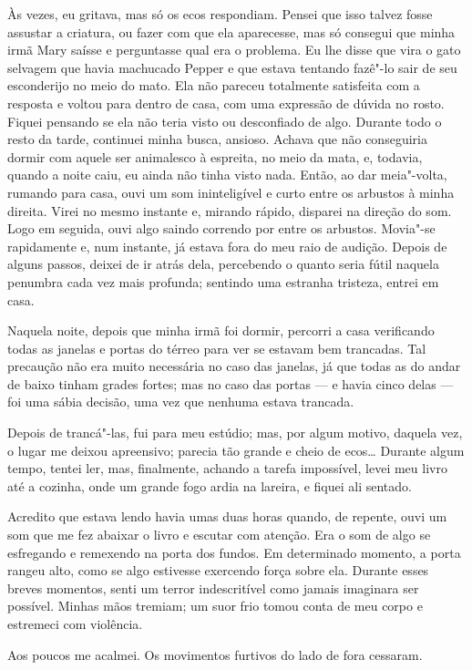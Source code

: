 Às vezes, eu gritava, mas só os ecos respondiam. Pensei que isso talvez fosse assustar a criatura, ou fazer com que 
ela aparecesse, mas só consegui que minha irmã Mary saísse e perguntasse qual era o problema. Eu lhe disse
que vira o gato selvagem que havia machucado Pepper e que estava tentando fazê"-lo sair de seu esconderijo no meio do
mato. Ela não pareceu totalmente satisfeita com a resposta e voltou para dentro de casa, com uma expressão de dúvida no
rosto. Fiquei pensando se ela não teria visto ou desconfiado de algo. Durante todo o resto da tarde, continuei minha
busca, ansioso. Achava que não conseguiria dormir com aquele ser animalesco à espreita, no meio da mata, e, todavia,
quando a noite caiu, eu ainda não tinha visto nada. Então, ao dar meia"-volta, rumando para casa, ouvi um som
ininteligível e curto entre os arbustos à minha direita. Virei no mesmo instante e, mirando rápido, disparei na direção
do som. Logo em seguida, ouvi algo saindo correndo por entre os arbustos. Movia"-se rapidamente e, num instante, já
estava fora do meu raio de audição. Depois de alguns passos, deixei de ir atrás dela, percebendo o quanto seria fútil
naquela penumbra cada vez mais profunda; sentindo uma estranha tristeza, entrei em casa.

Naquela noite, depois que minha irmã foi dormir, percorri a casa verificando todas as janelas e portas do térreo para
ver se estavam bem trancadas. Tal precaução não era muito necessária no caso das janelas, já que todas as do andar de
baixo tinham grades fortes; mas no caso das portas --- e havia cinco delas --- foi uma sábia decisão, uma vez que nenhuma estava
trancada.

Depois de trancá"-las, fui para meu estúdio; mas, por algum motivo, daquela vez, o lugar me deixou apreensivo; parecia
tão grande e cheio de ecos\ldots{} Durante algum tempo, tentei ler, mas, finalmente, achando a tarefa impossível, levei meu
livro até a cozinha, onde um grande fogo ardia na lareira, e fiquei ali sentado.

Acredito que estava lendo havia umas duas horas quando, de repente, ouvi um som que me fez abaixar o livro e escutar com
atenção. Era o som de algo se esfregando e remexendo na porta dos fundos. Em determinado momento, a porta rangeu alto,
como se algo estivesse exercendo força sobre ela. Durante esses breves momentos, senti um terror indescritível como
jamais imaginara ser possível. Minhas mãos tremiam; um suor frio tomou conta de meu corpo e estremeci com violência.

Aos poucos me acalmei. Os movimentos furtivos do lado de fora cessaram.

